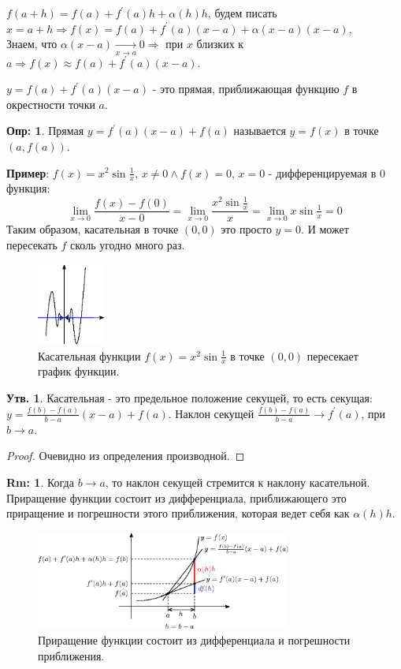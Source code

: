 \documentclass[12pt]{article}
\theoremstyle{definition}
\newtheorem{defn}{Опр:}
\newtheorem{rem}{Rm:}
\newtheorem{prop}{Утв.}
\begin{document}
$f(a+h) = f(a) + f^\prime(a)h + \alpha(h)h$, будем писать $x = a + h \Rightarrow f(x) = f(a) + f^\prime(a)(x-a) + \alpha(x-a)(x-a)$,\\
Знаем, что $\alpha(x-a) \xrightarrow[x \to a]{} 0 \Rightarrow$ при $x$ близких к $a \Rightarrow f(x) \approx f(a) + f^\prime(a)(x-a)$. 

$y = f(a) + f^\prime(a)(x-a)$ - это прямая, приближающая функцию $f$ в окрестности точки $a$.

\begin{defn}
	Прямая $y  = f^\prime(a)(x-a) + f(a)$ называется  $y = f(x)$ в точке $(a,f(a))$.
\end{defn}

\textbf{Пример}: $f(x) = x^2 \sin{\frac{1}{x}}, \, x \neq 0 \wedge f(x) = 0, \, x = 0$ - дифференцируемая в $0$ функция:
$$\lim\limits_{x \to 0}\dfrac{f(x) - f(0)}{x - 0} = \lim\limits_{x \to 0}\frac{x^2 \sin{\tfrac{1}{x}}}{x} = \lim\limits_{x \to 0}x \sin{\tfrac{1}{x}} = 0$$
Таким образом, касательная в точке $(0,0)$ это просто  $y = 0$. И может пересекать $f$ сколь угодно много раз.
\begin{figure}[H]
	\centering
	\includegraphics[width=0.2\textwidth]{21_3.eps}
	\caption{Касательная функции $f(x) = x^2 \sin{\frac{1}{x}}$ в точке $(0,0)$ пересекает график функции.}
	\label{21_3}
\end{figure}

\begin{prop}
	Касательная - это предельное положение секущей, то есть секущая: $y = \tfrac{f(b) - f(a)}{b - a}(x-a) + f(a)$. Наклон секущей $\tfrac{f(b) - f(a)}{b - a} \to f^\prime(a)$, при $b \to a$.
\end{prop}
\begin{proof}
	Очевидно из определения производной.
\end{proof}

\begin{rem}
	Когда $b \to a$, то наклон секущей стремится к наклону касательной. Приращение функции состоит из дифференциала, приближающего это приращение и погрешности этого приближения, которая ведет себя как $\alpha(h)h$. 
\end{rem}

\begin{figure}[H]
	\centering
	\includegraphics[width=0.75\textwidth]{21_4.eps}
	\caption{Приращение функции состоит из дифференциала и погрешности приближения.}
	\label{21_4}
\end{figure}
\end{document}
